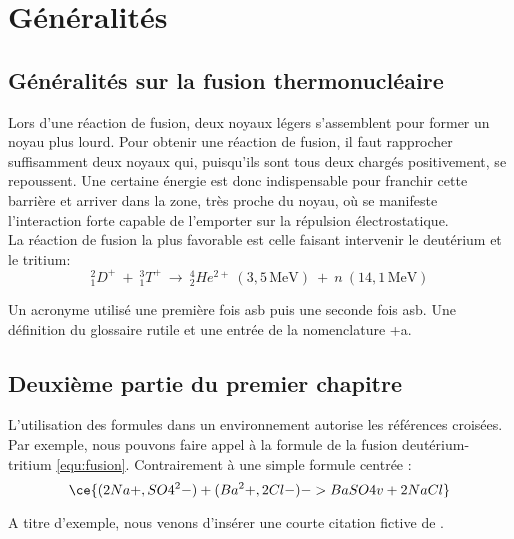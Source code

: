 \chapter{ Généralités}
\chaptertoc{}

\section{Généralités sur la fusion thermonucléaire}

	Lors d'une réaction de fusion, deux noyaux légers s'assemblent pour former un noyau plus lourd. Pour obtenir une réaction de fusion, il faut rapprocher suffisamment deux noyaux qui, puisqu'ils sont tous deux chargés positivement, se repoussent. Une certaine énergie est donc indispensable pour franchir cette barrière et arriver dans la zone, très proche du noyau, où se manifeste l'interaction forte capable de l'emporter sur la répulsion électrostatique.
	\\ %
	La réaction de fusion la plus favorable est celle faisant intervenir le deutérium et le tritium:
	\begin{equation}
		_{1}^{2}D^{+}~+~_{1}^{3}T^{+}~\rightarrow ~_{2}^{4}He^{2+}~(3,5\,\textrm{MeV})~+~n~(14,1\,\textrm{MeV})
	    \label{equ:fusion}
	\end{equation}

	\noindent %
	\lipsum[2]
	Un acronyme utilisé une première fois \gls{asb} puis une seconde fois \gls{asb}. Une définition du glossaire \gls{rutile} et une entrée de la nomenclature \gls{+a}.

\section{Deuxième partie du premier chapitre}

	\lipsum[2]

	L'utilisation des formules dans un environnement autorise les références croisées. Par exemple, nous pouvons faire appel à la formule de la fusion deutérium-tritium \ref{equ:fusion}. Contrairement à une simple formule centrée :
	$$\ce{(2Na+,SO4^2- ) + (Ba^2+, 2Cl- ) -> BaSO4 v + 2NaCl}$$

	\lipsum[9]

	\begin{displayquote}
	\lipsum[10]
	\end{displayquote}

	A titre d'exemple, nous venons d'insérer une courte citation fictive de \cite{godard_borreliose_2012}.
